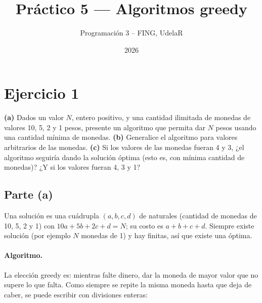 

\title{Práctico 5 --- Algoritmos greedy}
\author{Programación 3 -- FING, UdelaR}
\date{2026}


\maketitle

\section{Ejercicio 1}

\begin{enunciado}
\textbf{(a)} Dados un valor $N$, entero positivo, y una cantidad ilimitada de monedas de valores
10, 5, 2 y 1 pesos, presente un algoritmo que permita dar $N$ pesos usando una cantidad mínima
de monedas.
\textbf{(b)} Generalice el algoritmo para valores arbitrarios de las monedas.
\textbf{(c)} Si los valores de las monedas fueran 4 y 3, ¿el algoritmo seguiría dando la solución
óptima (esto es, con mínima cantidad de monedas)? ¿Y si los valores fueran 4, 3 y 1?
\end{enunciado}


\subsection*{Parte (a)}
Una solución es una cuádrupla $(a,b,c,d)$ de naturales (cantidad de monedas de 10, 5, 2 y 1) con
$10a+5b+2c+d=N$; su costo es $a+b+c+d$. Siempre existe solución (por ejemplo $N$ monedas de 1) y
hay finitas, así que existe una óptima.

\paragraph{Algoritmo.} La elección greedy es: mientras falte dinero, dar la moneda de mayor valor
que no supere lo que falta. Como siempre se repite la misma moneda hasta que deja de caber, se
puede escribir con divisiones enteras:

